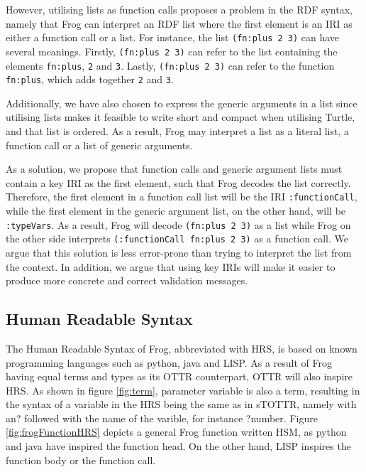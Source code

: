 \para
However, utilising lists as function calls proposes a problem in the RDF syntax, namely that Frog can interpret an RDF list where the first element is an IRI as either a function call or a list. For instance, the list \lstinline{(fn:plus 2 3)} can have several meanings. Firstly, \lstinline{(fn:plus 2 3)} can refer to the list containing the elements \lstinline{fn:plus}, \lstinline{2} and \lstinline{3}. Lastly, \lstinline{(fn:plus 2 3)} can refer to the function \lstinline{fn:plus}, which adds together \lstinline{2} and \lstinline{3}.

\para
Additionally, we have also chosen to express the generic arguments in a list since utilising lists makes it feasible to write short and compact when utilising Turtle, and that list is ordered. As a result, Frog may interpret a list as a literal list, a function call or a list of generic arguments.

\para
As a solution, we propose that function calls and generic argument lists must contain a key IRI as the first element, such that Frog decodes the list correctly. Therefore, the first element in a function call list will be the IRI \lstinline{:functionCall}, while the first element in the generic argument list, on the other hand, will be \lstinline{:typeVars}. As a result, Frog will decode \lstinline{(fn:plus 2 3)} as a list while Frog on the other side interprets \lstinline{(:functionCall fn:plus 2 3)} as a function call. We argue that this solution is less error-prone than trying to interpret the list from the context. In addition, we argue that using key IRIs will make it easier to produce more concrete and correct validation messages. 

\subsection{Human Readable Syntax}
The Human Readable Syntax of Frog, abbreviated with HRS, is based on known programming languages such as python, java and LISP. As a result of Frog having equal terms and types as its OTTR counterpart, OTTR will also inspire HRS. As shown in figure \ref{fig:term}, parameter variable is also a term, resulting in the syntax of a variable in the HRS being the same as in sTOTTR, namely with an? followed with the name of the varible, for instance ?number.  Figure \ref{fig:frogFunctionHRS} depicts a general Frog function written HSM, as python and java have inspired the function head. On the other hand, LISP inspires the function body or the function call. 

